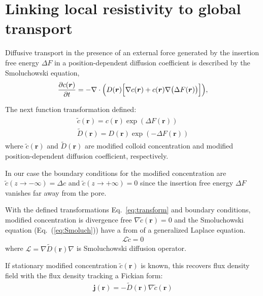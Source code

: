 \documentclass[12pt, a4paper]{article}
\begin{document}
\section{Linking local resistivity to global transport}


Diffusive transport in the presence of an external force generated by the insertion free energy $\Delta F$ in a position-dependent diffusion coefficient is described by the Smoluchowski equation,
\begin{equation}
    \frac{\partial c(\bm{r})}{\partial t}=-\nabla \cdot \Bigl(D(\bm{r}) \Bigl[\nabla c({\bm{r}})+c({\bm{r}})\nabla\bigl(\Delta F(\bm{r})\bigr)\Bigr]\Bigr),
    \label{eq:Smoluch}
\end{equation}

The next function transformation defined:
\begin{eqnarray}
    \begin{gathered}
        \tilde{c}(\bm{r}) = c(\bm{r})\exp(\Delta F(\bm{r}))
        \\
        \tilde{D}(\bm{r}) = D(\bm{r})\exp(-\Delta F(\bm{r})) 
    \end{gathered}
    \label{eq:transform}
\end{eqnarray}
where $\tilde{c}(\bm{r})$ and $\tilde{D}(\bm{r})$ are modified colloid concentration and modified position-dependent diffusion coefficient, respectively.

In our case the boundary conditions for the modified concentration are $\tilde{c}(z\rightarrow -\infty)=\Delta c$ and $\tilde{c}(z\rightarrow +\infty)=0$ since the insertion free energy $\Delta F$ vanishes far away from the pore.

With the defined transformations Eq.~\ref{eq:transform} and boundary conditions, modified concentration is divergence free $\nabla \tilde{c}(\bm{r}) = 0$ and the Smoluchowski equation (Eq.~(\ref{eq:Smoluch})) have a from of a generalized Laplace equation.
\begin{eqnarray}
    \mathcal{L} \tilde{c} = 0
    \label{eq:laplace}
\end{eqnarray}
where $\mathcal{L}  = \nabla \tilde{D}(\bm{r}) \nabla$ is Smoluchowski diffusion operator. 

If stationary modified concentration $\tilde{c}(\bm{r})$ is known, this recovers flux density field
with the flux density tracking a Fickian form:
\begin{eqnarray}
    \bm{j}(\bm{r}) = -\tilde{D}(\bm{r}) \nabla \tilde{c}(\bm{r})
\end{eqnarray}
\end{document}
